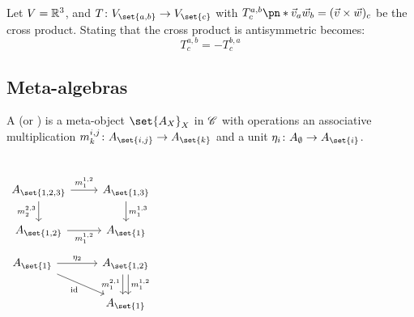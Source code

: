 \documentclass{beamer}
\begin{document}
\begin{frame}
        \begin{example}
                Let $V = \mathbb{R}^3$, and $\map {T} {V_{\set{a, b}}} {V_{\set{c}}}$
                with
                $T^{a, b}_{c}\pn*{\vec v_a\vec w_b} = (\vec v \times \vec w)_c$
                be the cross product. Stating that the cross product is
                antisymmetric becomes:
                \begin{equation}
                        T^{a, b}_{c} = -T^{b, a}_{c}
                \end{equation}
        \end{example}
\end{frame}

\subsection{Meta-algebras}

\begin{frame}
        \begin{definition}\label{def:meta_algebra}
                A  (or ) is a meta-object
                $\set{A_X}_X$ in $\mathscr{C}$ with operations an associative
                multiplication $\map {\mult^{i,j}_{k}} {A_{\set{i,j}}}
                {A_{\set{k}}}$  and a unit
                $\map{\unit_{i}}{A_{\emptyset}}{A_{\set{i}}}$.
        \end{definition}
        \begin{columns}
                \begin{equation*}\label{eq:cd_mult}
                        \begin{tikzcd}[ampersand replacement=\&]
                                A_{\set{1,2,3}}
                                \rar["\mult^{1,2}_{1}"]
                                \dar["\mult^{2,3}_{2}"']
                                \&A_{\set{1,3}}
                                \dar["\mult^{1,3}_{1}"] \\
                                A_{\set{1,2}}
                                \rar["\mult^{1,2}_{1}"']
                                \&A_{\set{1}}
                        \end{tikzcd}
                \end{equation*}
                \begin{equation*}\label{eq:cd_unit}
                \begin{tikzcd}[ampersand replacement=\&,column sep=large]
                        A_{\set{1}}
                                \rar["\unit_{2}"]
                                \drar["\id"']
                        \&A_{\set{1,2}}
                                \dar["\mult^{1,2}_{1}", shift left]
                                \dar["\mult^{2,1}_{1}"', shift right] \\
                        \&A_{\set{1}}
                \end{tikzcd}
                \end{equation*}
        \end{columns}
\end{frame}
\end{document}
